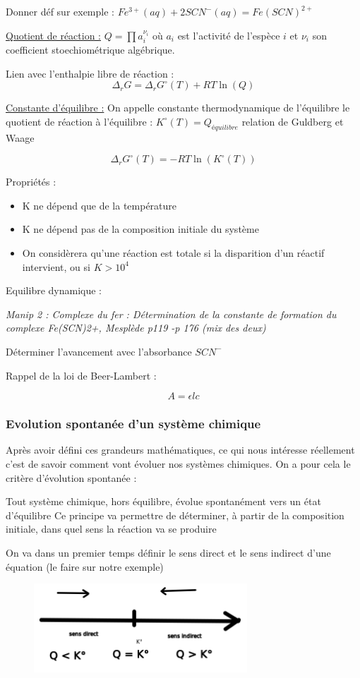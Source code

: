 \documentclass{article}%
\begin{document}
Donner déf sur exemple : $Fe^{3+} (aq) + 2 SCN^- (aq) = Fe(SCN)^{2+}$

\underline{Quotient de réaction :} $Q = \prod a_i^{\nu_i}$ où $a_i$ est l'activité de l'espèce $i$ et $\nu_i$ son coefficient stoechiométrique algébrique.

Lien avec l'enthalpie libre de réaction :\[\Delta_r G = \Delta_r G^\circ (T)  + RT\ln (Q)\]

\underline{Constante d'équilibre :} On appelle constante thermodynamique de l’équilibre le quotient de réaction à l’équilibre : $K^\circ (T)=Q_{équilibre}$ relation de Guldberg et Waage

\[\Delta_r G^\circ (T) = - RT\ln (K^\circ (T))\]

Propriétés : 
\begin{itemize}
	\item K ne dépend que de la température
	\item K ne dépend pas de la composition initiale du système
\item On considèrera qu’une réaction est totale si la disparition d’un réactif intervient, ou si $K>10^4$
\end{itemize}

Equilibre dynamique :

\textit{Manip 2 : Complexe du fer : Détermination de la constante de formation du complexe Fe(SCN)2+, Mesplède p119 -p 176 (mix des deux)}

Déterminer l'avancement avec l'absorbance $SCN^-$ 

Rappel de la loi de Beer-Lambert :

\[A = \epsilon l c\]

\subsubsection{Evolution spontanée d'un système chimique}

Après avoir défini ces grandeurs mathématiques, ce qui nous intéresse réellement c’est de savoir
comment vont évoluer nos systèmes chimiques. On a pour cela le critère d’évolution spontanée :

Tout système chimique, hors équilibre, évolue spontanément vers un état d’équilibre
Ce principe va permettre de déterminer, à partir de la composition initiale, dans quel sens la réaction
va se produire

On va dans un premier temps définir le sens direct et le sens indirect d’une équation (le faire sur
notre exemple)
\begin{figure}
\center
\includegraphics[width=8cm]{images/critère_évolution.png}
\end{figure}
\end{document}
